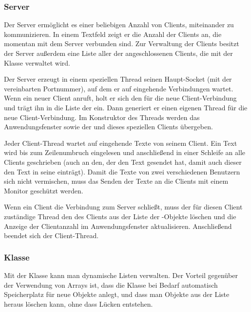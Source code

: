 \subsubsection{Server}

Der Server ermöglicht es einer beliebigen Anzahl von Clients, miteinander zu
kommunizieren. In einem Textfeld zeigt er die Anzahl der Clients an, die
momentan mit dem Server verbunden sind. Zur Verwaltung der Clients besitzt der
Server außerdem eine Liste aller  der
angeschlossenen Clients, die mit der Klasse  verwaltet wird.

Der Server erzeugt in einem speziellen Thread seinen Haupt-Socket (mit der
vereinbarten Portnummer), auf dem er auf eingehende Verbindungen wartet. Wenn
ein neuer Client \glqq anruft\grqq , holt er sich den
 für die neue Client-Verbindung und trägt ihn in
die Liste der  ein. Dann generiert er einen eigenen
Thread für die neue Client-Verbindung. Im Konstruktor des Threads werden das
Anwendungsfenster sowie der  und
 dieses speziellen Clients übergeben.

Jeder Client-Thread wartet auf eingehende Texte von seinem Client. Ein Text
wird bis zum Zeilenumbruch eingelesen und anschließend in einer Schleife an
alle Clients geschrieben (auch an den, der den Text gesendet hat, damit auch
dieser den Text in seine  einträgt). Damit die Texte von zwei
verschiedenen Benutzern sich nicht vermischen, muss das Senden der Texte an
die Clients mit einem Monitor geschützt werden.

Wenn ein Client die Verbindung zum Server schließt, muss der für diesen Client
zuständige Thread den  des Clients aus der Liste der
-Objekte löschen und die Anzeige der Clientanzahl im
Anwendungsfenster aktualisieren. Anschließend beendet sich der Client-Thread.

\subsubsection{Klasse }

Mit der Klasse  kann man dynamische Listen verwalten. Der
Vorteil gegenüber der Verwendung von Arrays ist, dass die Klasse bei Bedarf
automatisch Speicherplatz für neue Objekte anlegt, und dass man Objekte aus der
Liste heraus löschen kann, ohne dass Lücken entstehen.

